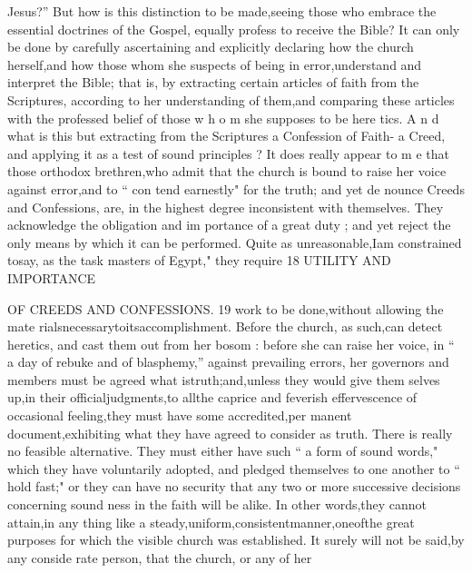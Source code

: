 \documentclass[
]{book}
\begin{document}
Jesus?'' But how is this distinction to be made,seeing those who embrace the essential doctrines of the Gospel, equally profess to receive the Bible? It can only be done by carefully ascertaining and explicitly declaring how the church herself,and how those whom she suspects of being in error,understand and interpret the Bible; that is, by extracting
certain articles of faith from the Scriptures, according to her understanding of them,and
comparing these articles with the professed
belief of those w h o m she supposes to be here
tics. A n d what is this but extracting from
the Scriptures a Confession of Faith- a Creed,
and applying it as a test of sound principles ? It does really appear to m e that those orthodox
brethren,who admit that the church is bound to raise her voice against error,and to `` con tend earnestly" for the truth; and yet de nounce Creeds and Confessions, are, in the highest degree inconsistent with themselves.
They acknowledge the obligation and im
portance of a great duty ; and yet reject the only means by which it can be performed. Quite as unreasonable,Iam constrained tosay, as the task masters of Egypt," they require
18
UTILITY AND IMPORTANCE

OF CREEDS AND CONFESSIONS. 19
work to be done,without allowing the mate
rialsnecessarytoitsaccomplishment. Before
the church, as such,can detect heretics, and cast them out from her bosom : before she can
raise her voice, in `` a day of rebuke and of blasphemy,'' against prevailing errors, her
governors and members must be agreed what istruth;and,unless they would give them selves up,in their officialjudgments,to allthe caprice and feverish effervescence of occasional feeling,they must have some accredited,per manent document,exhibiting what they have agreed to consider as truth. There is really no feasible alternative. They must either have such `` a form of sound words," which they have voluntarily adopted, and pledged themselves to one another to `` hold fast;" or
they can have no security that any two or
more successive decisions concerning sound ness in the faith will be alike. In other
words,they cannot attain,in any thing like a
steady,uniform,consistentmanner,oneofthe great purposes for which the visible church was established.
It surely will not be said,by any conside rate person, that the church, or any of her
\end{document}
